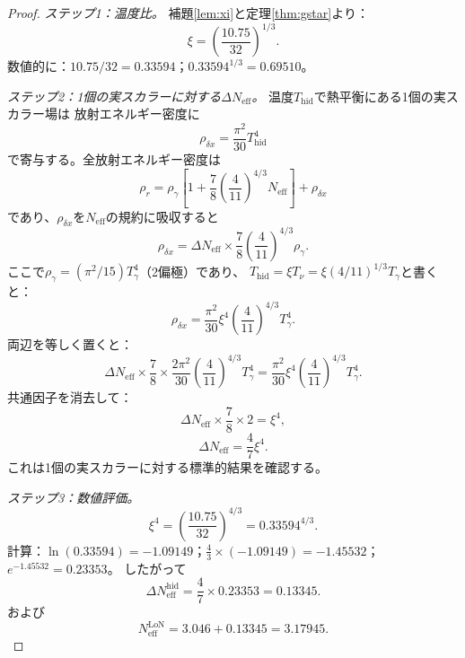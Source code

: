 \documentclass[12pt]{article}
\theoremstyle{plain}
\theoremstyle{definition}
\numberwithin{equation}{section}
\newcommand{\eff}{\mathrm{eff}}
\newcommand{\LoN}{\mathrm{LoN}}
\newcommand{\hid}{\mathrm{hid}}
\begin{document}
\begin{proof}
\emph{ステップ1：温度比。}
補題\ref{lem:xi}と定理\ref{thm:gstar}より：
\begin{equation}
\xi = \left(\frac{10.75}{32}\right)^{1/3}.
\end{equation}
数値的に：$10.75/32=0.33594$；$0.33594^{1/3}=0.69510$。

\emph{ステップ2：1個の実スカラーに対する$\Delta N_{\eff}$。}
温度$T_{\hid}$で熱平衡にある1個の実スカラー場は
放射エネルギー密度に
\begin{equation}
\rho_{\delta x} = \frac{\pi^2}{30}T_{\hid}^4
\end{equation}
で寄与する。全放射エネルギー密度は
\begin{equation}
\rho_r = \rho_\gamma\left[1+\frac{7}{8}\left(\frac{4}{11}\right)^{4/3}N_{\eff}\right]
+ \rho_{\delta x}
\end{equation}
であり、$\rho_{\delta x}$を$N_{\eff}$の規約に吸収すると
\begin{equation}
\rho_{\delta x} = \Delta N_{\eff}\times\frac{7}{8}\left(\frac{4}{11}\right)^{4/3}\rho_\gamma.
\end{equation}
ここで$\rho_\gamma=(\pi^2/15)T_\gamma^4$（2偏極）であり、
$T_{\hid}=\xi T_\nu=\xi(4/11)^{1/3}T_\gamma$と書くと：
\begin{equation}
\rho_{\delta x} = \frac{\pi^2}{30}\xi^4\left(\frac{4}{11}\right)^{4/3}T_\gamma^4.
\end{equation}
両辺を等しく置くと：
\begin{equation}
\Delta N_{\eff}\times\frac{7}{8}\times\frac{2\pi^2}{30}\left(\frac{4}{11}\right)^{4/3}T_\gamma^4
= \frac{\pi^2}{30}\xi^4\left(\frac{4}{11}\right)^{4/3}T_\gamma^4.
\end{equation}
共通因子を消去して：
\begin{equation}
\Delta N_{\eff}\times\frac{7}{8}\times 2 = \xi^4,
\end{equation}
\begin{equation}
\Delta N_{\eff} = \frac{4}{7}\xi^4.
\end{equation}
これは1個の実スカラーに対する標準的結果を確認する。

\emph{ステップ3：数値評価。}
\begin{equation}
\xi^4 = \left(\frac{10.75}{32}\right)^{4/3}
= 0.33594^{4/3}.
\end{equation}
計算：$\ln(0.33594)=-1.09149$；$\frac{4}{3}\times(-1.09149)=-1.45532$；
$e^{-1.45532}=0.23353$。
したがって
\begin{equation}
\Delta N_{\eff}^{\hid} = \frac{4}{7}\times0.23353 = 0.13345.
\end{equation}
および
\begin{equation}
N_{\eff}^{\LoN} = 3.046 + 0.13345 = 3.17945.
\end{equation}
\end{proof}
\end{document}
